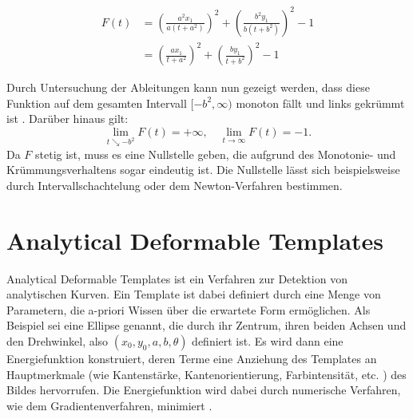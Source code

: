 \begin{enumerate}
\[
	\begin{aligned}
		F(t) &= \left(\frac{a^2x_1}{a\left(t+a^2\right)}\right)^2 + \left(\frac{b^2y_1}{b\left(t+b^2\right)}\right)^2 - 1 \\
		&= \left(\frac{ax_1}{t+a^2}\right)^2 + \left(\frac{by_1}{t+b^2}\right)^2 - 1
	\end{aligned}
\]

	Durch Untersuchung der Ableitungen kann nun gezeigt werden, dass diese Funktion auf dem gesamten Intervall $[-b^2,\infty)$ monoton fällt und links gekrümmt ist \cite{Eberly2013}. Darüber hinaus gilt:
	\[
	\lim\limits_{t \searrow -b^2}{F(t)}	= +\infty, \quad\lim\limits_{t \rightarrow \infty}{F(t)}	= -1.
	\]
	Da $F$ stetig ist, muss es eine Nullstelle geben, die aufgrund des Monotonie- und Krümmungsverhaltens sogar eindeutig ist. Die Nullstelle lässt sich beispielsweise durch Intervallschachtelung oder dem Newton-Verfahren bestimmen.
\end{enumerate}


\section{Analytical Deformable Templates}
\label{s:anaDef}
Analytical Deformable Templates ist ein Verfahren zur Detektion von analytischen Kurven.
Ein Template ist dabei definiert durch eine Menge von Parametern, die a-priori Wissen über die erwartete Form ermöglichen.
Als Beispiel sei eine  Ellipse genannt, die durch ihr Zentrum, ihren beiden Achsen und den Drehwinkel, also $(x_0,y_0,a,b,\theta)$ definiert ist.
Es wird dann eine Energiefunktion konstruiert, deren Terme eine Anziehung des Templates an Hauptmerkmale (wie Kantenstärke, Kantenorientierung, Farbintensität, etc. ) des Bildes hervorrufen.
Die Energiefunktion wird dabei durch numerische Verfahren, wie dem Gradientenverfahren, minimiert \cite{Yuille1992}.
